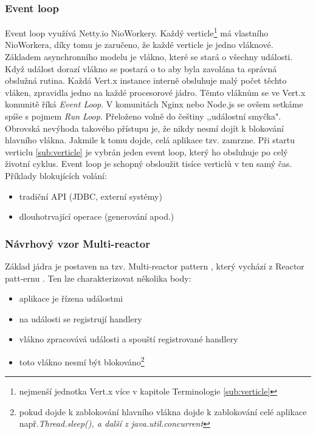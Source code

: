 \subsubsection{Event loop}

Event loop využívá Netty.io NioWorkery. Každý verticle\footnote{nejmenší jednotka Vert.x více v kapitole Terminologie \ref{sub:verticle}} má vlastního NioWorkera, díky tomu je zaručeno, že každé verticle je jedno vláknové. Základem asynchronního modelu je vlákno, které se stará o všechny události. Když událost dorazí vlákno se postará o to aby byla zavolána ta správná obslužná rutina. Každá Vert.x instance interně obsluhuje malý počet těchto vláken, zpravidla jedno na každé procesorové jádro. Těmto vláknům se ve Vert.x komunitě říká \emph{Event Loop}. V komunitách Nginx nebo Node.js se ovšem setkáme spíše s pojmem \emph{Run Loop}. Přeloženo volně do češtiny ,,událostní smyčka". Obrovská nevýhoda takového přístupu je, že nikdy nesmí dojít k blokování hlavního vlákna. Jakmile k tomu dojde, celá aplikace tzv. zamrzne. Při startu verticlu \ref{sub:verticle} je vybrán jeden event loop, který ho obsluhuje po celý životní cyklus. Event loop je schopný obsloužit tisíce verticlů v ten samý čas. Příklady blokujících volání:
\begin{itemize}
\item{tradiční API (JDBC, externí systémy)}
\item{dlouhotrvající operace (generování apod.)}
\end{itemize}

\subsubsection{Návrhový vzor Multi-reactor}\label{sub:multireactor}

Základ jádra je postaven na tzv.
Multi-reactor pattern \cite{eventLoops}, který vychází z Reactor 
patt-ernu \cite{reactorPattern}. Ten lze charakterizovat několika body:

\begin{itemize}
\item{aplikace je řízena událostmi}
\item{na události se registrují handlery}
\item{vlákno zpracovává události a spouští registrované handlery}
\item{toto vlákno nesmí být blokováno\footnote{pokud dojde k zablokování hlavního vlákna dojde k zablokování celé aplikace např.\emph{Thread.sleep(), a další z java.util.concurrent }}}
\end{itemize}

